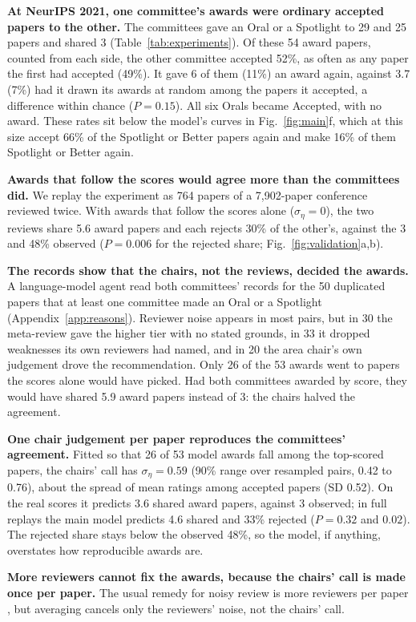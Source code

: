 \documentclass{article}
\begin{document}
\textbf{At NeurIPS 2021, one committee's awards were ordinary accepted papers to the other.} The committees gave an Oral or a Spotlight to 29 and 25 papers and shared 3 (Table~\ref{tab:experiments}). Of these 54 award papers, counted from each side, the other committee accepted 52\%, as often as any paper the first had accepted (49\%). It gave 6 of them (11\%) an award again, against 3.7 (7\%) had it drawn its awards at random among the papers it accepted, a difference within chance ($P=0.15$). All six Orals became Accepted, with no award. These rates sit below the model's curves in Fig.~\ref{fig:main}f, which at this size accept 66\% of the Spotlight or Better papers again and make 16\% of them Spotlight or Better again.

\textbf{Awards that follow the scores would agree more than the committees did.} We replay the experiment as 764 papers of a 7,902-paper conference reviewed twice. With awards that follow the scores alone ($\sigma_\eta=0$), the two reviews share 5.6 award papers and each rejects 30\% of the other's, against the 3 and 48\% observed ($P=0.006$ for the rejected share; Fig.~\ref{fig:validation}a,b).

\textbf{The records show that the chairs, not the reviews, decided the awards.} A language-model agent read both committees' records for the 50 duplicated papers that at least one committee made an Oral or a Spotlight (Appendix~\ref{app:reasons}). Reviewer noise appears in most pairs, but in 30 the meta-review gave the higher tier with no stated grounds, in 33 it dropped weaknesses its own reviewers had named, and in 20 the area chair's own judgement drove the recommendation. Only 26 of the 53 awards went to papers the scores alone would have picked. Had both committees awarded by score, they would have shared 5.9 award papers instead of 3: the chairs halved the agreement.

\textbf{One chair judgement per paper reproduces the committees' agreement.} Fitted so that 26 of 53 model awards fall among the top-scored papers, the chairs' call has $\sigma_\eta=0.59$ (90\% range over resampled pairs, 0.42 to 0.76), about the spread of mean ratings among accepted papers (SD 0.52). On the real scores it predicts 3.6 shared award papers, against 3 observed; in full replays the main model predicts 4.6 shared and 33\% rejected ($P=0.32$ and $0.02$). The rejected share stays below the observed 48\%, so the model, if anything, overstates how reproducible awards are.

\textbf{More reviewers cannot fix the awards, because the chairs' call is made once per paper.} The usual remedy for noisy review is more reviewers per paper \citep{kaplan2008sample,snell2015menage,forscher2019many}, but averaging cancels only the reviewers' noise, not the chairs' call.
\end{document}
